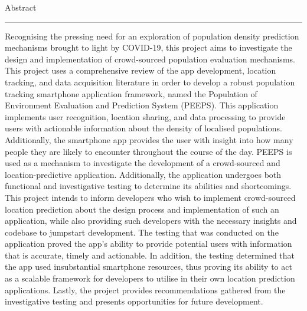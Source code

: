 {\Large Abstract}\\
\hrule

Recognising the pressing need for an exploration of population density prediction mechanisms brought to light by COVID-19, this project aims to investigate the design and implementation of crowd-sourced population evaluation mechanisms. This project uses a comprehensive review of the app development, location tracking, and data acquisition literature in order to develop a robust population tracking smartphone application framework, named the Population of Environment Evaluation and Prediction System (PEEPS). This application implements user recognition, location sharing, and data processing to provide users with actionable information about the density of localised populations. Additionally, the smartphone app provides the user with insight into how many people they are likely to encounter throughout the course of the day. PEEPS is used as a mechanism to investigate the development of a crowd-sourced and location-predictive application. Additionally, the application undergoes both functional and investigative testing to determine its abilities and shortcomings. This project intends to inform developers who wish to implement crowd-sourced location prediction about the design process and implementation of such an application, while also providing such developers with the necessary insights and codebase to jumpstart development. The testing that was conducted on the application proved the app's ability to provide potential users with information that is accurate, timely and actionable. In addition, the testing determined that the app used insubstantial smartphone resources, thus proving its ability to act as a scalable framework for developers to utilise in their own location prediction applications. Lastly, the project provides recommendations gathered from the investigative testing and presents opportunities for future development.